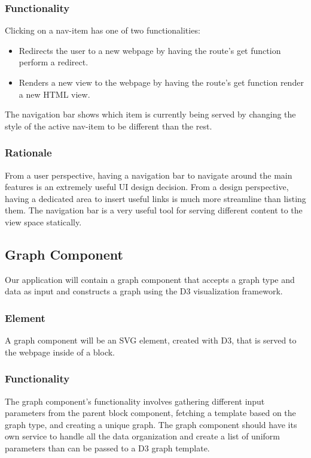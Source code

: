 \documentclass[journal,10pt,onecolumn,compsoc]{IEEEtran}
\begin{document}
			\subsubsection{Functionality}
				Clicking on a nav-item has one of two functionalities: 
				\begin{itemize}
					\item Redirects the user to a new webpage by having the route's get function perform a redirect.
					\item Renders a new view to the webpage by having the route's get function render a new HTML view.
				\end{itemize}
				The navigation bar shows which item is currently being served by changing the style of the active nav-item to be different than the rest.
			\subsubsection{Rationale}
				From a user perspective, having a navigation bar to navigate around the main features is an extremely useful UI design decision. 
				From a design perspective, having a dedicated area to insert useful links is much more streamline than listing them. 
				The navigation bar is a very useful tool for serving different content to the view space statically.
		
		\subsection{Graph Component}
			Our application will contain a graph component that accepts a graph type and data as input and constructs a graph using the D3 visualization framework.
			\subsubsection{Element}
				A graph component will be an SVG element, created with D3, that is served to the webpage inside of a block. 
			\subsubsection{Functionality}
				The graph component's functionality involves gathering different input parameters from the parent block component, fetching a template based on the graph type, and creating a unique graph. 
				The graph component should have its own service to handle all the data organization and create a list of uniform parameters than can be passed to a D3 graph template.
\end{document}
